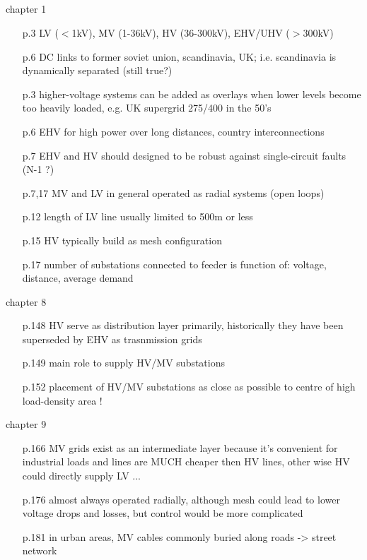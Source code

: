 \documentclass[paper=a4, fontsize=12pt]{article}
\begin{document}
\subsection*{\citeauthor{Lakervi1995} \cite{Lakervi1995}}

chapter 1

\begin{itemize}
\item[p.3] LV ($<$1kV), MV (1-36kV), HV (36-300kV), EHV/UHV ($>$300kV) 
\item[p.6] DC links to former soviet union, scandinavia, UK; i.e. scandinavia is dynamically separated (still true?) 
\item[p.3] higher-voltage systems can be added as overlays when lower levels become too heavily loaded, e.g. UK supergrid 275/400 in the 50's 
\item[p.6] EHV for high power over long distances, country interconnections 
\item[p.7] EHV and HV should designed to be robust against single-circuit faults (N-1 ?) 
\item[p.7,17] MV and LV in general operated as radial systems (open loops)
\item[p.12] length of LV line usually limited to 500m or less 
\item[p.15] HV typically build as mesh configuration
\item[p.17] number of substations connected to feeder is function of: voltage, distance, average demand
\end{itemize}

chapter 8
\begin{itemize}
\item[p.148] HV serve as distribution layer primarily, historically they have been superseded by EHV as trasnmission grids
\item[p.149] main role to supply HV/MV substations
\item[p.152] placement of HV/MV substations as close as possible to centre of high load-density area !
\end{itemize}

chapter 9

\begin{itemize}
\item[p.166] MV grids exist as an intermediate layer because it's convenient for industrial loads and lines are MUCH cheaper then HV lines, other wise HV could directly supply LV ...
\item[p.176] almost always operated radially, although mesh could lead to lower voltage drops and losses, but control would be more complicated
\item[p.181] in urban areas, MV cables commonly buried along roads -> street network
\end{itemize}
\end{document}
